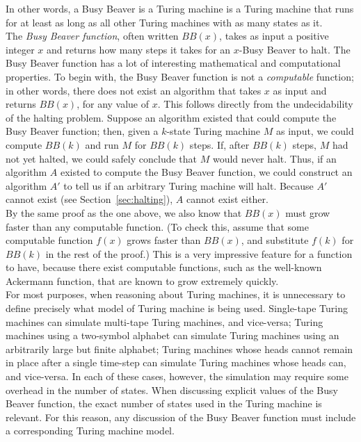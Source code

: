 \documentclass{report}
\begin{document}
In other words, a Busy Beaver is a Turing machine is a Turing machine that runs for at least as long as all other Turing machines with as many states as it. \\

The \emph{Busy Beaver function}, often written $BB(x)$, takes as input a positive integer $x$ and returns how many steps it takes for an $x$-Busy Beaver to halt. The Busy Beaver function has a lot of interesting mathematical and computational properties. To begin with, the Busy Beaver function is not a \emph{computable} function; in other words, there does not exist an algorithm that takes $x$ as input and returns $BB(x)$, for any value of $x$. This follows directly from the undecidability of the halting problem. Suppose an algorithm existed that could compute the Busy Beaver function; then, given a $k$-state Turing machine $M$ as input, we could compute $BB(k)$ and run $M$ for $BB(k)$ steps. If, after $BB(k)$ steps, $M$ had not yet halted, we could safely conclude that $M$ would never halt. Thus, if an algorithm $A$ existed to compute the Busy Beaver function, we could construct an algorithm $A'$ to tell us if an arbitrary Turing machine will halt. Because $A'$ cannot exist (see Section~\ref{sec:halting}), $A$ cannot exist either. \\

By the same proof as the one above, we also know that $BB(x)$ must grow faster than any computable function. (To check this, assume that some computable function $f(x)$ grows faster than $BB(x)$, and substitute $f(k)$ for $BB(k)$ in the rest of the proof.) This is a very impressive feature for a function to have, because there exist computable functions, such as the well-known Ackermann function, that are known to grow extremely quickly. \\

For most purposes, when reasoning about Turing machines, it is unnecessary to define precisely what model of Turing machine is being used. Single-tape Turing machines can simulate multi-tape Turing machines, and vice-versa; Turing machines using a two-symbol alphabet can simulate Turing machines using an arbitrarily large but finite alphabet; Turing machines whose heads cannot remain in place after a single time-step can simulate Turing machines whose heads can, and vice-versa. In each of these cases, however, the simulation may require some overhead in the number of states. When discussing explicit values of the Busy Beaver function, the exact number of states used in the Turing machine is relevant. For this reason, any discussion of the Busy Beaver function must include a corresponding Turing machine model. \\
\end{document}
